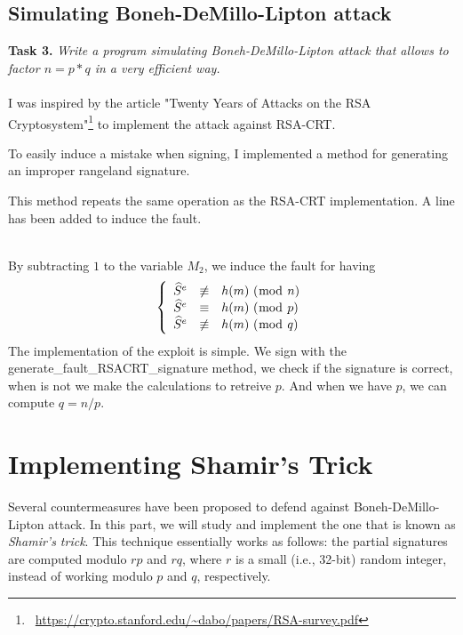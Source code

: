 \documentclass[a4paper]{report}
\begin{document}
\section{Simulating Boneh-DeMillo-Lipton attack}
\textbf{Task 3.} \textit{Write a program simulating Boneh-DeMillo-Lipton attack that allows to factor $n = p*q$ in a very efficient way.}
\\ \\
I was inspired by the article "Twenty Years of Attacks on the RSA Cryptosystem"\footnote{\ \href{https://crypto.stanford.edu/~dabo/papers/RSA-survey.pdf}{\url{https://crypto.stanford.edu/~dabo/papers/RSA-survey.pdf}}} to implement the attack against RSA-CRT.

To easily induce a mistake when signing, I implemented a method for generating an improper rangeland signature.


This method repeats the same operation as the RSA-CRT implementation. A line has been added to induce the fault.

\ 
\\
By subtracting $1$ to the variable $M_2$, we induce the fault for having
\[
\left \{
   \begin{array}{r c l}
      \widehat{S}^e  & \not\equiv & h(m)\ (\bmod\ n) \\
      \widehat{S}^e   & \equiv & h(m)\ (\bmod\ p) \\
      \widehat{S}^e & \not\equiv & h(m)\ (\bmod\ q)
   \end{array}
\right .
\]
\newpage
The implementation of the exploit is simple. We sign with the generate\_fault\_RSACRT\_signature method, we check if the signature is correct, when is not we make the calculations to retreive $p$. And when we have $p$, we can compute $q = n / p$.


\chapter{Implementing Shamir’s Trick}
Several countermeasures have been proposed to defend against Boneh-DeMillo-Lipton attack. In this part, we will study and implement the one that is known as \textit{Shamir’s trick}. This technique essentially works as follows: the partial signatures are computed modulo $rp$ and $rq$, where $r$ is a small (i.e., 32-bit) random integer, instead of working modulo $p$ and $q$, respectively.
\end{document}
